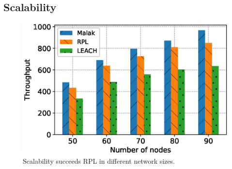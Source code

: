 \subsection{Scalability}

\begin{figure}[htbp]
	\centering
	\includegraphics[width=.95\columnwidth]{Figure/scalability}
	\vspace{-0.1in}
	\caption{Scalability
		\textnormal{
			{\sdn} succeeds RPL in different network sizes.
		}}
	\label{fig:scalability}
\end{figure}


